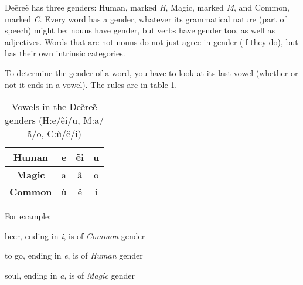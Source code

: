 Deẽreẽ has three genders: Human, marked \emph{H}, Magic, marked \emph{M}, and Common, marked
\emph{C}. Every word has a gender, whatever its grammatical nature (part of speech) might be: nouns
have gender, but verbs have gender too, as well as adjectives. Words that are not nouns do not just
agree in gender (if they do), but has their own intrinsic categories.

To determine the gender of a word, you have to look at its last vowel (whether or not it ends in a
vowel). The rules are in table \ref{tab:morph-genders}.

\begin{table}[h]\label{tab:morph-genders}
\begin{center}
\begin{tabular}{|c|c|c|c|}
\hline
\textbf{Human}  & e & ẽi & u\\\hline
\textbf{Magic}  & a & ã  & o\\\hline
\textbf{Common} & ù & ë  & i\\\hline
\end{tabular}
\end{center}
\caption{Vowels in the Deẽreẽ genders (H:e/ẽi/u, M:a/ã/o, C:ù/ë/i)}
\end{table}

For example:
\begin{description}
\item[\gls{zhalbarki}] beer, ending in \emph{i}, is of \emph{Common} gender
\item[\gls{drete}] to go, ending in \emph{e}, is of \emph{Human} gender
\item[\gls{magra}] soul, ending in \emph{a}, is of \emph{Magic} gender
\end{description}

